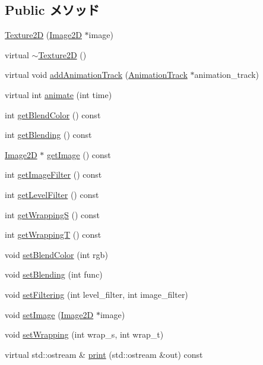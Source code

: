 \subsection*{Public メソッド}
\begin{CompactItemize}
\item 
\hyperlink{classm3g_1_1Texture2D_7a8d6431e41022e29ac936afc5e97b8e}{Texture2D} (\hyperlink{classm3g_1_1Image2D}{Image2D} $\ast$image)
\item 
virtual \hyperlink{classm3g_1_1Texture2D_060332aea614a81a914cd2e55f1794df}{$\sim$Texture2D} ()
\item 
virtual void \hyperlink{classm3g_1_1Texture2D_415c0b110f95410ded9b85e5d99a496b}{addAnimationTrack} (\hyperlink{classm3g_1_1AnimationTrack}{AnimationTrack} $\ast$animation\_\-track)
\item 
virtual int \hyperlink{classm3g_1_1Texture2D_82cfeb67ca66b93e2ca7bda9a4f0e2aa}{animate} (int time)
\item 
int \hyperlink{classm3g_1_1Texture2D_b7dc7b7bf2934448281894f2c1ef3638}{getBlendColor} () const 
\item 
int \hyperlink{classm3g_1_1Texture2D_078954de3d786bd11dc98b06f237bbbb}{getBlending} () const 
\item 
\hyperlink{classm3g_1_1Image2D}{Image2D} $\ast$ \hyperlink{classm3g_1_1Texture2D_a8c0193b0e7d47d4b5c9f60df24c44f5}{getImage} () const 
\item 
int \hyperlink{classm3g_1_1Texture2D_7b1e1ea0acc3d2096d346afdecc2ea5f}{getImageFilter} () const 
\item 
int \hyperlink{classm3g_1_1Texture2D_039f7813e846bedec1aaf4c413c15924}{getLevelFilter} () const 
\item 
int \hyperlink{classm3g_1_1Texture2D_6bdb583791178dc5002f4d0ae88293a9}{getWrappingS} () const 
\item 
int \hyperlink{classm3g_1_1Texture2D_58375e5e8ddde63dcf74f882d053ae3f}{getWrappingT} () const 
\item 
void \hyperlink{classm3g_1_1Texture2D_b5a6333203f443fb1f66ea2e39d4de1b}{setBlendColor} (int rgb)
\item 
void \hyperlink{classm3g_1_1Texture2D_189d98ce3e8ac7590be771944b3186d4}{setBlending} (int func)
\item 
void \hyperlink{classm3g_1_1Texture2D_857574b5c0f3e0ca9239bafb4008cae1}{setFiltering} (int level\_\-filter, int image\_\-filter)
\item 
void \hyperlink{classm3g_1_1Texture2D_705b89b41cd1b38f664ed912be44baaa}{setImage} (\hyperlink{classm3g_1_1Image2D}{Image2D} $\ast$image)
\item 
void \hyperlink{classm3g_1_1Texture2D_e676f34bd2f5ee1508ad1cb771702d8f}{setWrapping} (int wrap\_\-s, int wrap\_\-t)
\item 
virtual std::ostream \& \hyperlink{classm3g_1_1Texture2D_6fea17fa1532df3794f8cb39cb4f911f}{print} (std::ostream \&out) const 
\end{CompactItemize}
